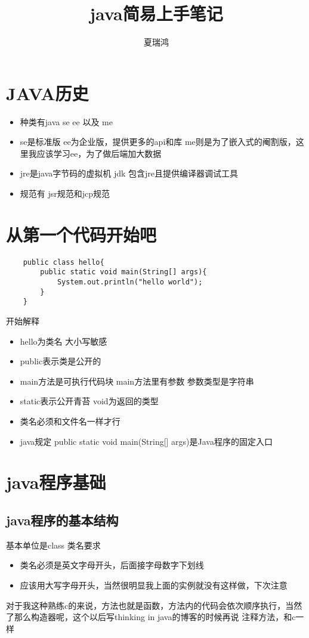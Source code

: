 \documentclass[a4paper,12pt]{ctexbook}
\author{夏瑞鸿}
\title{java简易上手笔记}
\begin{document}
\maketitle
\section{JAVA历史}
\begin{itemize}
    \item 种类有java se ee 以及 me 
    \item se是标准版 ee为企业版，提供更多的api和库 me则是为了嵌入式的阉割版，这里我应该学习ee，为了做后端加大数据
    \item jre是java字节码的虚拟机 jdk 包含jre且提供编译器调试工具
    \item 规范有 jsr规范和jcp规范
\end{itemize}
\section{从第一个代码开始吧}
\begin{lstlisting}
    public class hello{
        public static void main(String[] args){
            System.out.println("hello world");
        }
    }
\end{lstlisting}
开始解释
\begin{itemize}
    \item hello为类名 大小写敏感 
    \item public表示类是公开的
    \item main方法是可执行代码块 main方法里有参数 参数类型是字符串
    \item static表示公开青苔 void为返回的类型
    \item 类名必须和文件名一样才行
    \item java规定 public static void main(String[] args)是Java程序的固定入口
\end{itemize}
\section{java程序基础}
\subsection{java程序的基本结构}
基本单位是class
类名要求
\begin{itemize}
    \item 类名必须是英文字母开头，后面接字母数字下划线
    \item 应该用大写字母开头，当然很明显我上面的实例就没有这样做，下次注意
\end{itemize}
对于我这种熟练c的来说，方法也就是函数，方法内的代码会依次顺序执行，当然了那么构造器呢，这个以后写thinking in java的博客的时候再说
注释方法，和c一样
\end{document}
